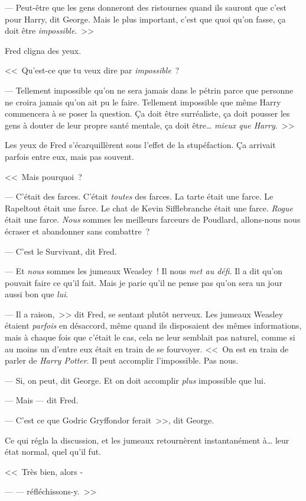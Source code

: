 --- Peut-être que les gens donneront des ristournes quand ils sauront que c'est pour Harry, dit George. Mais le plus important, c'est que quoi qu'on fasse, ça doit être \emph{impossible}.~>>

Fred cligna des yeux.

<<~Qu'est-ce que tu veux dire par \emph{impossible}~?

--- Tellement impossible qu'on ne sera jamais dans le pétrin parce que personne ne croira jamais qu'on ait pu le faire. Tellement impossible que même Harry commencera à se poser la question. Ça doit être surréaliste, ça doit pousser les gens à douter de leur propre santé mentale, ça doit être… \emph{mieux que Harry}.~>>

Les yeux de Fred s'écarquillèrent sous l'effet de la stupéfaction. Ça arrivait parfois entre eux, mais pas souvent.

<<~Mais pourquoi~?

--- C'était des farces. C'était \emph{toutes} des farces. La tarte était une farce. Le Rapeltout était une farce. Le chat de Kevin Sifflebranche était une farce. \emph{Rogue} était une farce. \emph{Nous} sommes les meilleurs farceurs de Poudlard, allons-nous nous écraser et abandonner sans combattre~?

--- C'est le Survivant, dit Fred.

--- Et \emph{nous} sommes les jumeaux Weasley~! Il nous \emph{met au défi}. Il a dit qu'on pouvait faire ce qu'il fait. Mais je parie qu'il ne pense pas qu'on sera un jour aussi bon que \emph{lui}.

--- Il a raison,~>> dit Fred, se sentant plutôt nerveux. Les jumeaux Weasley étaient \emph{parfois} en désaccord, même quand ils disposaient des mêmes informations, mais à chaque fois que c'était le cas, cela ne leur semblait pas naturel, comme si au moins un d'entre eux était en train de se fourvoyer. <<~On est en train de parler de \emph{Harry Potter}. Il peut accomplir l'impossible. Pas nous.

--- Si, on peut, dit George. Et on doit accomplir \emph{plus} impossible que lui.

--- Mais — dit Fred.

--- C'est ce que Godric Gryffondor ferait~>>, dit George.

Ce qui régla la discussion, et les jumeaux retournèrent instantanément à… leur état normal, quel qu'il fut.

<<~Très bien, alors -

--- — réfléchissons-y.~>>
